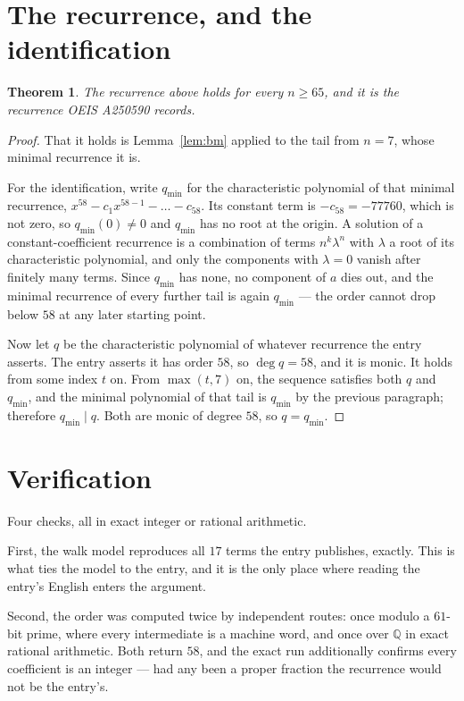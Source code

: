 \documentclass[11pt,a4paper]{article}
\theoremstyle{plain}
\newtheorem{theorem}{Theorem}
\theoremstyle{definition}
\begin{document}
\section{The recurrence, and the identification}

\begin{theorem}
The recurrence above holds for every $n\ge65$, and it is the recurrence OEIS A250590 records.
\end{theorem}

\begin{proof}
That it holds is Lemma~\ref{lem:bm} applied to the tail from $n=7$, whose minimal
recurrence it is.

For the identification, write $q_{\min}$ for the characteristic polynomial of that minimal
recurrence, $x^{58}-c_1x^{58-1}-\dots-c_{58}$. Its constant term is
$-c_{58}=-77760$, which is not zero, so $q_{\min}(0)\neq0$ and $q_{\min}$ has no
root at the origin. A solution of a constant-coefficient recurrence is a combination of terms
$n^{k}\lambda^{n}$ with $\lambda$ a root of its characteristic polynomial, and only the
components with $\lambda=0$ vanish after finitely many terms. Since $q_{\min}$ has none, no
component of $a$ dies out, and the minimal recurrence of every further tail is again
$q_{\min}$ --- the order cannot drop below $58$ at any later starting point.

Now let $q$ be the characteristic polynomial of whatever recurrence the entry asserts. The
entry asserts it has order $58$, so $\deg q=58$, and it is monic. It holds from some
index $t$ on. From $\max(t,7)$ on, the sequence satisfies both $q$ and $q_{\min}$, and
the minimal polynomial of that tail is $q_{\min}$ by the previous paragraph; therefore
$q_{\min}\mid q$. Both are monic of degree $58$, so $q=q_{\min}$.
\end{proof}

\section{Verification}

Four checks, all in exact integer or rational arithmetic.

First, the walk model reproduces all $17$ terms the entry publishes, exactly. This is
what ties the model to the entry, and it is the only place where reading the entry's English
enters the argument.

Second, the order was computed twice by independent routes: once modulo a $61$-bit prime, where
every intermediate is a machine word, and once over $\mathbb{Q}$ in exact rational arithmetic.
Both return $58$, and the exact run additionally confirms every coefficient is an integer
--- had any been a proper fraction the recurrence would not be the entry's.
\end{document}

